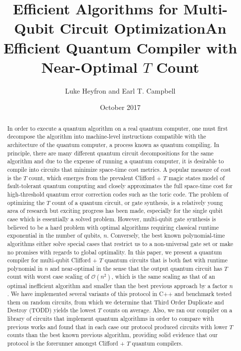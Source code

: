\documentclass[notitlepage]{article}
\title{Efficient Algorithms for Multi-Qubit Circuit Optimization}
\title{An Efficient Quantum Compiler with Near-Optimal $T$ Count}
\author{Luke Heyfron and Earl T. Campbell}
\date{October 2017}
\theoremstyle{definition}
\theoremstyle{problem}
\theoremstyle{lemma}
\begin{document}
	\maketitle
	\begin{abstract}
In order to execute a quantum algorithm on a real quantum computer, one must first decompose the algorithm into machine-level instructions compatible with the architecture of the quantum computer, a process known as quantum compiling.
In principle, there are many different quantum circuit decompositions for the same algorithm and due to the expense of running a quantum computer, it is desirable to compile into circuits that minimize space-time cost metrics. A popular measure of cost is the $T$ count, which emerges from the prevalent Clifford + $T$ magic states model of fault-tolerant quantum computing and closely approximates the full space-time cost for high-threshold quantum error correction codes such as the toric code.
The problem of optimizing the $T$ count of a quantum circuit, or gate synthesis, is a relatively young area of research but exciting progress has been made, especially for the single qubit case which is essentially a solved problem. However, multi-qubit gate synthesis is believed to be a hard problem with optimal algorithms requiring classical runtime exponential in the number of qubits, $n$. Conversely, the best known polynomial-time algorithms either solve special cases that restrict us to a non-universal gate set or make no promises with regards to global optimality. In this paper, we present a quantum compiler for multi-qubit Clifford + $T$ quantum circuits that is both fast with runtime polynomial in $n$ and near-optimal in the sense that the output quantum circuit has $T$ count with worst case scaling of $\mathcal{O}(n^2)$, which is the same scaling as that of an optimal inefficient algorithm and smaller than the best previous approach by a factor $n$. We have implemented several variants of this protocol in C++ and benchmark tested them on random circuits, from which we determine that Third Order Duplicate and Destroy (TODD) yields the lowest $T$ counts on average. Also, we ran our compiler on a library of circuits that implement quantum algorithms in order to compare with previous works and found that in each case our protocol produced circuits with lower $T$ counts than the best known previous algorithm, providing solid evidence that our protocol is the forerunner amongst Clifford + $T$ quantum compilers. 
		

\end{abstract}
\end{document}
